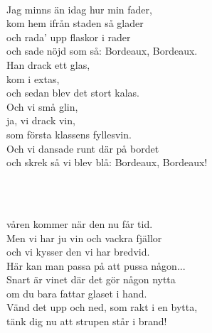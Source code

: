 
 \\       

\songtext{}Jag minns än idag hur min fader, \\
kom hem ifrån staden så glader \\
och rada' upp flaskor i rader \\
och sade nöjd som så: Bordeaux, Bordeaux. \\
Han drack ett glas, \\
kom i extas, \\
och sedan blev det stort kalas. \\
Och vi små glin, \\
ja, vi drack vin, \\
som första klassens fyllesvin. \\
Och vi dansade runt där på bordet \\
och skrek så vi blev blå: Bordeaux, Bordeaux! \\
 
\newpage

 \\       

 \\
våren kommer när den nu får tid. \\
Men vi har ju vin och vackra fjällor \\
och vi kysser den vi har bredvid. \\
Här kan man passa på att pussa någon... \\
Snart är vinet där det gör någon nytta \\
om du bara fattar glaset i hand. \\
Vänd det upp och ned, som rakt i en bytta, \\
tänk dig nu att strupen står i brand! \\



 \\       


